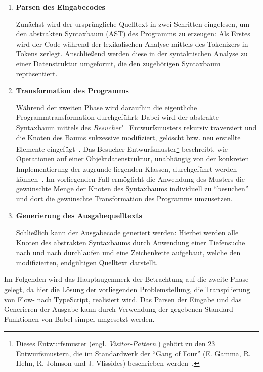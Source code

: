 \begin{enumerate}
  \item \textbf{Parsen des Eingabecodes}

    Zunächst wird der ursprüngliche Quelltext in zwei Schritten eingelesen, um den abstrakten Syntaxbaum (AST) des Programms zu erzeugen: Als Erstes wird der Code während der lexikalischen Analyse mittels des Tokenizers in Tokens zerlegt. Anschließend werden diese in der syntaktischen Analyse zu einer Datenstruktur umgeformt, die den zugehörigen Syntaxbaum repräsentiert.
    \\

  \item \textbf{Transformation des Programms}

    Während der zweiten Phase wird daraufhin die eigentliche Programmtransformation durchgeführt: Dabei wird der abstrakte Syntaxbaum mittels des \textit{Besucher}"=Entwurfsmusters rekursiv traversiert und die Knoten des Baums sukzessive modifiziert, gelöscht bzw. neu erstellte Elemente eingefügt~\autocite{BABEL_HANDBOOK}. Das Besucher-Entwurfsmuster\footnote{Dieses Entwurfsmuster (engl. \textit{Visitor-Pattern.}) gehört zu den 23 Entwurfsmustern, die im Standardwerk  der \enquote{Gang of Four} (E. Gamma, R. Helm, R. Johnson und J. Vlissides) beschrieben werden~\autocite[306\psqq]{GAMMA:1994}.} beschreibt, wie Operationen auf einer Objektdatenstruktur, unabhängig von der konkreten Implementierung der zugrunde liegenden Klassen, durchgeführt werden können~\autocite[634\psq]{Freeman:2004}. Im vorliegenden Fall ermöglicht die Anwendung des Musters die gewünschte Menge der Knoten des Syntaxbaums individuell zu \enquote{besuchen} und dort die gewünschte Transformation des Programms umzusetzen.
    \\

  \item \textbf{Generierung des Ausgabequelltexts}

    Schließlich kann der Ausgabecode generiert werden: Hierbei werden alle Knoten des abstrakten Syntaxbaums durch Anwendung einer Tiefensuche nach und nach durchlaufen und eine Zeichenkette aufgebaut, welche den modifizierten, endgültigen Quelltext darstellt.
\end{enumerate}

Im Folgenden wird das Hauptaugenmerk der Betrachtung auf die zweite Phase gelegt, da hier die Lösung der vorliegenden Problemstellung, die Transpilierung von Flow- nach TypeScript, realisiert wird. Das Parsen der Eingabe und das Generieren der Ausgabe kann durch Verwendung der gegebenen Standard-Funktionen von Babel simpel umgesetzt werden.

